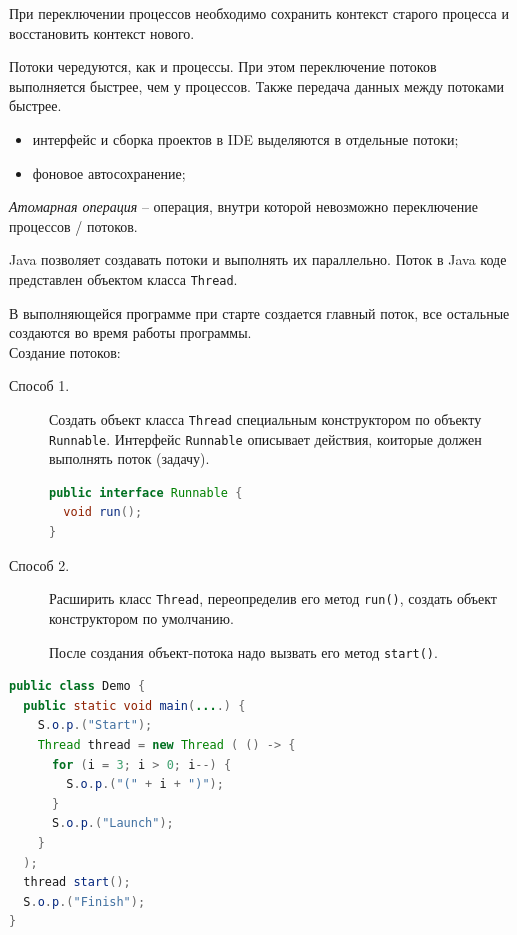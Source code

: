 При переключении процессов необходимо сохранить контекст старого процесса и восстановить контекст нового.

Потоки чередуются, как и процессы. При этом переключение потоков выполняется быстрее, чем у процессов. Также передача данных между потоками быстрее.


\begin{eg}\leavevmode
	\begin{itemize}
		\item интерфейс и сборка проектов в IDE выделяются в отдельные потоки;
		\item фоновое автосохранение;
	\end{itemize}
\end{eg}

\begin{definition}
	\emph{Атомарная операция} -- операция, внутри которой невозможно переключение процессов / потоков.
\end{definition}

Java позволяет создавать потоки и выполнять их параллельно. Поток в Java коде представлен объектом класса \verb|Thread|.

В выполняющейся программе при старте создается главный поток, все остальные создаются во время работы программы. \\

Создание потоков:
\begin{description}
	\item[Способ 1.] Создать объект класса \verb|Thread| специальным конструктором по объекту \verb|Runnable|. Интерфейс \verb|Runnable| описывает действия, коиторые должен выполнять поток (задачу).
	      \begin{lstlisting}[language=Java]
public interface Runnable {
  void run();
}
    \end{lstlisting}
	\item[Способ 2.] Расширить класс \verb|Thread|, переопределив его метод \verb|run()|, создать объект конструктором по умолчанию.

	      После создания объект-потока надо вызвать его метод \verb|start()|.
\end{description}

\newpage

\begin{eg}\leavevmode
	\begin{lstlisting}[language=Java]
public class Demo {
  public static void main(....) {
    S.o.p.("Start");
    Thread thread = new Thread ( () -> {
      for (i = 3; i > 0; i--) {
        S.o.p.("(" + i + ")");
      }
      S.o.p.("Launch");
    }
  );
  thread start();
  S.o.p.("Finish");
}
  \end{lstlisting}
\end{eg}

